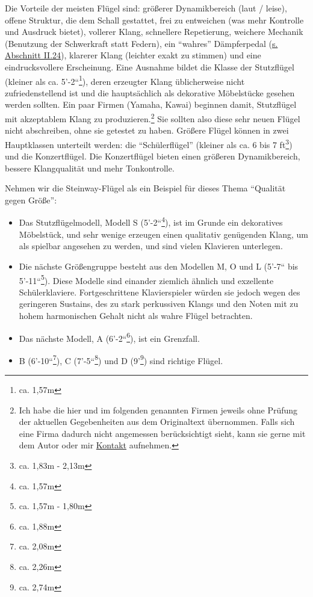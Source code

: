 Die Vorteile der meisten Flügel sind: größerer Dynamikbereich (laut / leise), offene Struktur, die dem Schall gestattet, frei zu entweichen (was mehr Kontrolle und Ausdruck bietet), vollerer Klang, schnellere Repetierung, weichere Mechanik (Benutzung der Schwerkraft statt Federn), ein \enquote{wahres} Dämpferpedal (\hyperref[c1ii24]{s. Abschnitt II.24}), klarerer Klang (leichter exakt zu stimmen) und eine eindrucksvollere Erscheinung.
Eine Ausnahme bildet die Klasse der Stutzflügel (kleiner als ca. 5'-2``\footnote{ca. 1,57m}), deren erzeugter Klang üblicherweise nicht zufriedenstellend ist und die hauptsächlich als dekorative Möbelstücke gesehen werden sollten.
Ein paar Firmen (Yamaha, Kawai) beginnen damit, Stutzflügel mit akzeptablem Klang zu produzieren.\footnote{Ich habe die hier und im folgenden genannten Firmen jeweils ohne Prüfung der aktuellen Gegebenheiten aus dem Originaltext übernommen.
Falls sich eine Firma dadurch nicht angemessen berücksichtigt sieht, kann sie gerne mit dem Autor oder mir \hyperref[kontakt]{Kontakt} aufnehmen.}
Sie sollten also diese sehr neuen Flügel nicht abschreiben, ohne sie getestet zu haben.
Größere Flügel können in zwei Hauptklassen unterteilt werden: die \enquote{Schülerflügel}  (kleiner als ca. 6 bis 7 ft\footnote{ca. 1,83m - 2,13m}) und die Konzertflügel.
Die Konzertflügel bieten einen größeren Dynamikbereich, bessere Klangqualität und mehr Tonkontrolle.

Nehmen wir die Steinway-Flügel als ein Beispiel für dieses Thema \enquote{Qualität gegen Größe}:

\begin{itemize} 
 \item Das Stutzflügelmodell, Modell S (5'-2``\footnote{ca. 1,57m}), ist im Grunde ein dekoratives Möbelstück, und sehr wenige erzeugen einen qualitativ genügenden Klang, um als spielbar angesehen zu werden, und sind vielen Klavieren unterlegen.
 \item Die nächste Größengruppe besteht aus den Modellen M, O und L (5'-7`` bis 5'-11``\footnote{ca. 1,57m - 1,80m}).
Diese Modelle sind einander ziemlich ähnlich und exzellente Schülerklaviere.
Fortgeschrittene Klavierspieler würden sie jedoch wegen des geringeren Sustains, des zu stark perkussiven Klangs und den Noten mit zu hohem harmonischen Gehalt nicht als wahre Flügel betrachten.
 \item Das nächste Modell, A (6'-2``\footnote{ca. 1,88m}), ist ein Grenzfall.
 \item B (6'-10``\footnote{ca. 2,08m}), C (7'-5``\footnote{ca. 2,26m}) und D (9'\footnote{ca. 2,74m}) sind richtige Flügel.
\end{itemize}

